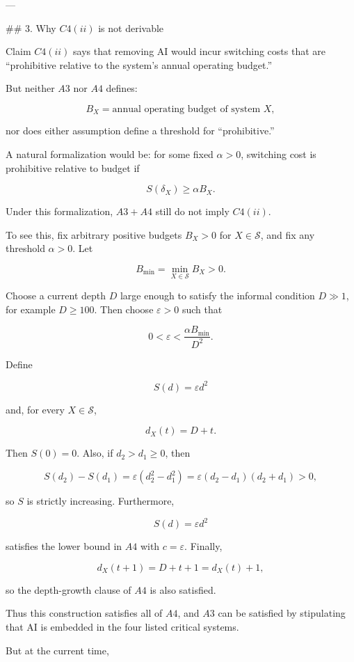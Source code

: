 ---

## 3. Why \(C4(ii)\) is not derivable

Claim \(C4(ii)\) says that removing AI would incur switching costs that are “prohibitive relative to the system’s annual operating budget.”

But neither \(A3\) nor \(A4\) defines:

\[
B_X=\text{annual operating budget of system }X,
\]

nor does either assumption define a threshold for “prohibitive.”

A natural formalization would be: for some fixed \(\alpha>0\), switching cost is prohibitive relative to budget if

\[
S(\delta_X)\ge \alpha B_X.
\]

Under this formalization, \(A3+A4\) still do not imply \(C4(ii)\).

To see this, fix arbitrary positive budgets \(B_X>0\) for \(X\in\mathcal S\), and fix any threshold \(\alpha>0\). Let

\[
B_{\min}=\min_{X\in\mathcal S} B_X>0.
\]

Choose a current depth \(D\) large enough to satisfy the informal condition \(D\gg 1\), for example \(D\ge 100\). Then choose \(\varepsilon>0\) such that

\[
0<\varepsilon<\frac{\alpha B_{\min}}{D^2}.
\]

Define

\[
S(d)=\varepsilon d^2
\]

and, for every \(X\in\mathcal S\),

\[
d_X(t)=D+t.
\]

Then \(S(0)=0\). Also, if \(d_2>d_1\ge 0\), then

\[
S(d_2)-S(d_1)
=
\varepsilon(d_2^2-d_1^2)
=
\varepsilon(d_2-d_1)(d_2+d_1)>0,
\]

so \(S\) is strictly increasing. Furthermore,

\[
S(d)=\varepsilon d^2
\]

satisfies the lower bound in \(A4\) with \(c=\varepsilon\). Finally,

\[
d_X(t+1)=D+t+1=d_X(t)+1,
\]

so the depth-growth clause of \(A4\) is also satisfied.

Thus this construction satisfies all of \(A4\), and \(A3\) can be satisfied by stipulating that AI is embedded in the four listed critical systems.

But at the current time,

